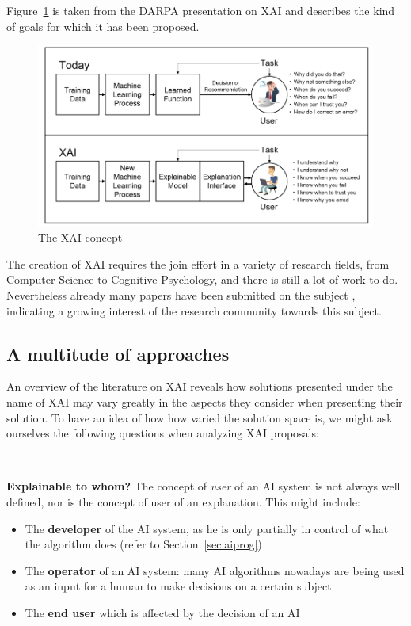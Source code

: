 \documentclass[conference]{IEEEtran}
\newcommand{\cit}{\todo[tickmarkheight=0.2cm]{cit}}
\begin{document}
Figure~\ref{fig:xai} is taken from the DARPA presentation on XAI and describes the kind of goals for which it has been proposed.


\begin{figure}[h!] \centering \includegraphics[width=\linewidth]{images/xai.png}
    \caption{The XAI concept  } \label{fig:xai} \end{figure}

The creation of XAI requires the join effort in a variety of research fields, from Computer Science to Cognitive
Psychology, and there is still a lot of work to do. Nevertheless already many papers have been submitted on the subject \cit, indicating a growing interest of the research community towards this subject.

\subsection{A multitude of approaches}
\label{sec:dimensions}

An overview of the literature on XAI reveals how solutions presented under the name of XAI may vary greatly in the aspects they consider when presenting their solution. To have an idea of how how varied the solution space is, we might ask ourselves the following questions when analyzing XAI proposals:

\

\textbf{Explainable to whom?} The concept of \textit{user} of an AI system is not always well defined, nor is the concept of user of an explanation. This might include:

\begin{itemize}
    \item The \textbf{developer} of the AI system, as he is only partially in control of what the algorithm does (refer to Section~\ref{sec:aiprog})
    \item The \textbf{operator} of an AI system: many AI algorithms nowadays are being used as an input for a human to make decisions on a certain subject
    \item The \textbf{end user} which is affected by the decision of an AI
\end{itemize}
\end{document}
